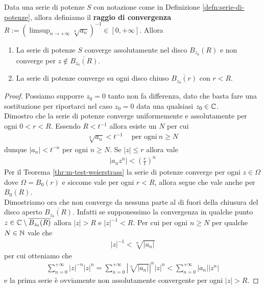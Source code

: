 \begin{theorem}
	\label{thr:criterio-hadamard}
	Data una serie di potenze $S$ con notazione come in Definizione \ref{defn:serie-di-potenze}, allora definiamo il \textbf{raggio di convergenza} $R := ( \limsup_{n\to+\infty} \sqrt[n]{a_n})^{-1} \in \left[0,+\infty\right]$. Allora 
	\begin{enumerate}
		\item La serie di potenze $S$ converge assolutamente nel disco $B_{z_0}(R)$ e non converge per $z \notin \overline{B_{z_0}(R)}$.
		\item La serie di potenze converge su ogni disco chiuso $\overline{B_{z_0}(r)}$ con $r < R$.  
	\end{enumerate}
\end{theorem}
\begin{proof}
	Possiamo supporre $z_0 = 0$ tanto non fa differenza, dato che basta fare una sostituzione per riportarci nel caso $z_0 = 0$ data una qualsiasi $z_0 \in \mathbb{C}$.\\ 
	Dimostro che la serie di potenze converge uniformemente e assolutamente per ogni $0 < r < R$. Essendo $R < t^{-1}$ allora esiste un $N$ per cui
	\begin{equation}
	\begin{aligned}
		\sqrt[n]{a_n} < t^{-1} \quad\ \text{per ogni}\ n \ge N 
	\end{aligned}
	\end{equation}
	dunque $|a_n| < t^{-n}$ per ogni $n \ge N$. Se $|z| \le r$ allora vale
	\begin{equation}
	\begin{aligned}
		|a_nz^n| < \left(\frac{r}{t}\right)^n
	\end{aligned}
	\end{equation}
	Per il Teorema \ref{thr:m-test-weierstrass} la serie di potenze converge per ogni $z \in \Omega$ dove $\Omega = B_0(r)$ e siccome vale per ogni $r < R$, allora segue che vale anche per $B_0(R)$.\\
	
	Dimostriamo ora che non converge da nessuna parte al di fuori della chiusura del disco aperto $\overline{B_{z_0}(R)}$. Infatti se supponessimo la convergenza in qualche punto $z \in \mathbb{C} \setminus \overline{B_{z_0}(R)}$ allora $|z| > R$ e $|z|^{-1} < R$. Per cui per ogni $n \ge N$ per qualche $N \in \mathbb{N}$ vale che
	\begin{equation}
	\begin{aligned}
		|z|^{-1} < \sqrt[n]{|a_n|}
	\end{aligned}
	\end{equation}
	per cui otteniamo che 
	\begin{equation}
	\begin{aligned}
		\sum^{+\infty}_{n=0}|z|^{-n}|z|^n = \sum^{+\infty}_{n=0}|\sqrt[n]{|a_n|}|^n|z|^n < \sum^{+\infty}_{n=0}|a_n||z^n| 
	\end{aligned}
	\end{equation}
	e la prima serie è ovviamente non assolutamente convergente per ogni $|z| > R$.
\end{proof}

